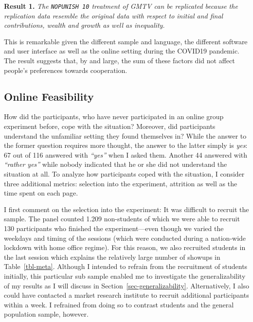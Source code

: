 \documentclass[
  authoryear,
  preprint,
  3p]{elsarticle}
\begin{document}
\textbf{Result 1.} \emph{The \texttt{NOPUNISH\ 10} treatment of GMTV can
be replicated because the replication data resemble the original data
with respect to initial and final contributions, wealth and growth as
well as inequality.}

This is remarkable given the different sample and language, the
different software and user interface as well as the online setting
during the COVID19 pandemic. The result suggests that, by and large, the
sum of these factors did not affect people's preferences towards
cooperation.

\hypertarget{sec-feasibility}{%
\subsection{Online Feasibility}\label{sec-feasibility}}

How did the participants, who have never participated in an online group
experiment before, cope with the situation? Moreover, did participants
understand the unfamiliar setting they found themselves in? While the
answer to the former question requires more thought, the answer to the
latter simply is \emph{yes}: 67 out of 116 answered with \emph{``yes''}
when I asked them. Another 44 answered with \emph{``rather yes''} while
nobody indicated that he or she did not understand the situation at all.
To analyze how participants coped with the situation, I consider three
additional metrics: selection into the experiment, attrition as well as
the time spent on each page.

I first comment on the selection into the experiment: It was difficult
to recruit the sample. The panel counted 1.209 non-students of which we
were able to recruit 130 participants who finished the experiment---even
though we varied the weekdays and timing of the sessions (which were
conducted during a nation-wide lockdown with home office regime). For
this reason, we also recruited students in the last session which
explains the relatively large number of showups in Table~\ref{tbl-meta}.
Although I intended to refrain from the recruitment of students
initially, this particular sub sample enabled me to investigate the
generalizability of my results as I will discuss in
Section~\ref{sec-generalizability}. Alternatively, I also could have
contacted a market research institute to recruit additional participants
within a week. I refrained from doing so to contrast students and the
general population sample, however.
\end{document}
